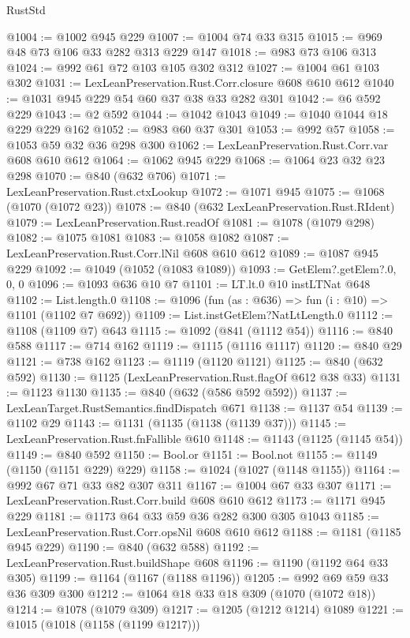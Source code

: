 \begin{lexlean}{RustStd}
\begin{coremodule}
@1004 := @1002 @945 @229
@1007 := @1004 @74 @33 @315
@1015 := @969 @48 @73 @106 @33 @282 @313 @229 @147
@1018 := @983 @73 @106 @313
@1024 := @992 @61 @72 @103 @105 @302 @312
@1027 := @1004 @61 @103 @302
@1031 := LexLeanPreservation.Rust.Corr.closure @608 @610 @612
@1040 := @1031 @945 @229 @54 @60 @37 @38 @33 @282 @301
@1042 := @6 @592 @229
@1043 := @2 @592
@1044 := @1042 @1043
@1049 := @1040 @1044 @18 @229 @229 @162
@1052 := @983 @60 @37 @301
@1053 := @992 @57
@1058 := @1053 @59 @32 @36 @298 @300
@1062 := LexLeanPreservation.Rust.Corr.var @608 @610 @612
@1064 := @1062 @945 @229
@1068 := @1064 @23 @32 @23 @298
@1070 := @840 (@632 @706)
@1071 := LexLeanPreservation.Rust.ctxLookup
@1072 := @1071 @945
@1075 := @1068 (@1070 (@1072 @23))
@1078 := @840 (@632 LexLeanPreservation.Rust.RIdent)
@1079 := LexLeanPreservation.Rust.readOf
@1081 := @1078 (@1079 @298)
@1082 := @1075 @1081
@1083 := @1058 @1082
@1087 := LexLeanPreservation.Rust.Corr.lNil @608 @610 @612
@1089 := @1087 @945 @229
@1092 := @1049 (@1052 (@1083 @1089))
@1093 := GetElem?.getElem?.{0, 0, 0}
@1096 := @1093 @636 @10 @7
@1101 := LT.lt.{0} @10 instLTNat @648
@1102 := List.length.{0}
@1108 := @1096 (fun (as : @636) => fun (i : @10) => @1101 (@1102 @7 @692))
@1109 := List.instGetElem?NatLtLength.{0}
@1112 := @1108 (@1109 @7) @643
@1115 := @1092 (@841 (@1112 @54))
@1116 := @840 @588
@1117 := @714 @162
@1119 := @1115 (@1116 @1117)
@1120 := @840 @29
@1121 := @738 @162
@1123 := @1119 (@1120 @1121)
@1125 := @840 (@632 @592)
@1130 := @1125 (LexLeanPreservation.Rust.flagOf @612 @38 @33)
@1131 := @1123 @1130
@1135 := @840 (@632 (@586 @592 @592))
@1137 := LexLeanTarget.RustSemantics.findDispatch @671
@1138 := @1137 @54
@1139 := @1102 @29
@1143 := @1131 (@1135 (@1138 (@1139 @37)))
@1145 := LexLeanPreservation.Rust.fnFallible @610
@1148 := @1143 (@1125 (@1145 @54))
@1149 := @840 @592
@1150 := Bool.or
@1151 := Bool.not
@1155 := @1149 (@1150 (@1151 @229) @229)
@1158 := @1024 (@1027 (@1148 @1155))
@1164 := @992 @67 @71 @33 @82 @307 @311
@1167 := @1004 @67 @33 @307
@1171 := LexLeanPreservation.Rust.Corr.build @608 @610 @612
@1173 := @1171 @945 @229
@1181 := @1173 @64 @33 @59 @36 @282 @300 @305 @1043
@1185 := LexLeanPreservation.Rust.Corr.opsNil @608 @610 @612
@1188 := @1181 (@1185 @945 @229)
@1190 := @840 (@632 @588)
@1192 := LexLeanPreservation.Rust.buildShape @608
@1196 := @1190 (@1192 @64 @33 @305)
@1199 := @1164 (@1167 (@1188 @1196))
@1205 := @992 @69 @59 @33 @36 @309 @300
@1212 := @1064 @18 @33 @18 @309 (@1070 (@1072 @18))
@1214 := @1078 (@1079 @309)
@1217 := @1205 (@1212 @1214) @1089
@1221 := @1015 (@1018 (@1158 (@1199 @1217)))

\end{coremodule}
\end{lexlean}
